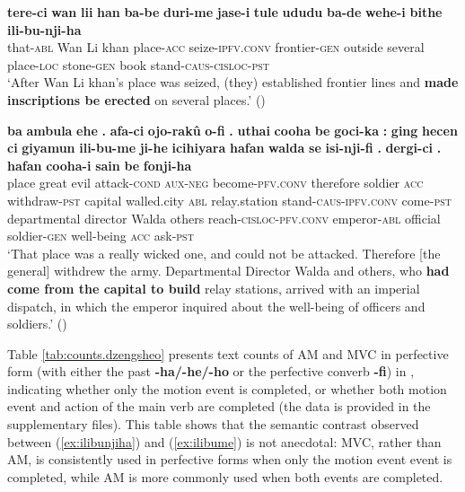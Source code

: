 \documentclass{article}
\newcommand{\ipa}[1]{\textbf{{\phon\mbox{#1}}}} %
\begin{document}
\begin{exe}
\ex \label{ex:ilibunjiha}
\gll
\ipa{tere-ci} 	\ipa{wan} 	\ipa{lii} 	\ipa{han} 	\ipa{ba-be} 	\ipa{duri-me} 	\ipa{jase-i} 	\ipa{tule} 	\ipa{ududu} 	\ipa{ba-de} 	\ipa{wehe-i} 	\ipa{bithe} 	\ipa{ili-bu-nji-ha} \\
that-\textsc{abl} Wan Li khan place-\textsc{acc} seize-\textsc{ipfv.conv} frontier-\textsc{gen} outside several place-\textsc{loc} stone-\textsc{gen} book stand-\textsc{caus-cisloc-pst} \\
\glt ‘After Wan Li khan’s place was seized, (they) established frontier lines and \textbf{made inscriptions be erected} on several places.’ (\citealt[129-130;46]{shunjuu92yargiyan})
\end{exe}

\begin{exe}
\ex \label{ex:ilibume}
\gll
\ipa{ba} 	\ipa{ambula} 	\ipa{ehe} 	\ipa{.} 	\ipa{afa-ci} 	\ipa{ojo-rakû} 	\ipa{o-fi} 	\ipa{.} 	\ipa{uthai} 	\ipa{cooha} 	\ipa{be} 	\ipa{goci-ka} 	\ipa{:} 	\ipa{ging} 	\ipa{hecen} 	\ipa{ci} 	\ipa{giyamun} 	\ipa{ili-bu-me} 	\ipa{ji-he} 	\ipa{icihiyara} 	\ipa{hafan} 	\ipa{walda} 	\ipa{se} 	\ipa{isi-nji-fi} 	\ipa{.} 	\ipa{dergi-ci} 	\ipa{.} 	\ipa{hafan} 	\ipa{cooha-i} 	\ipa{sain} 	\ipa{be} 	\ipa{fonji-ha} \\
place great evil { } attack-\textsc{cond} \textsc{aux-neg} become-\textsc{pfv.conv} { } therefore soldier \textsc{acc} withdraw-\textsc{pst} { } capital walled.city \textsc{abl} relay.station stand-\textsc{caus-ipfv.conv} come-\textsc{pst} departmental director Walda others reach-\textsc{cisloc-pfv.conv} { } emperor-\textsc{abl} { } official soldier-\textsc{gen} well-being \textsc{acc} ask-\textsc{pst} \\
\glt `That place was a really wicked one, and could not be attacked. Therefore [the general] withdrew the army. Departmental Director Walda and others, who \textbf{had come from the capital to build} relay stations, arrived with an imperial dispatch, in which the emperor inquired about the well-being of officers and soldiers.' (\citealt[94/62]{cosmo06dzengseo})
\end{exe}

Table \ref{tab:counts.dzengsheo} presents text counts of AM and MVC in perfective form (with either the past \ipa{-ha/-he/-ho} or the perfective converb \ipa{-fi}) in \citet{cosmo06dzengseo}, indicating whether only the motion event is completed, or whether both motion event and action of the main verb are completed (the data is provided in the supplementary files). This table shows that the semantic contrast observed between (\ref{ex:ilibunjiha}) and (\ref{ex:ilibume}) is not anecdotal: MVC, rather than AM,  is consistently used in perfective forms when only the motion event event is completed, while AM is more commonly used when both events are completed.
\end{document}
